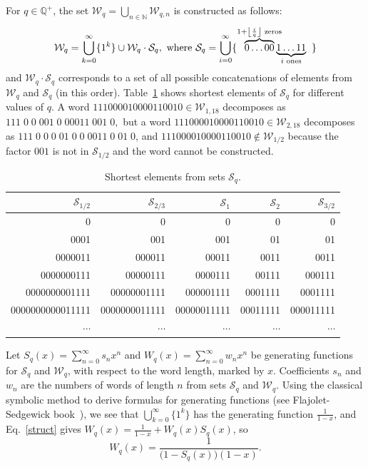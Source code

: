 \documentclass[a4paper,12pt]{article}
\theoremstyle{definition}
\newcommand{\W}{\mathcal{W}}
\newcommand{\N}{\mathbb{N}}
\newcommand{\Q}{\mathbb{Q}}
\newcommand{\s}{\mathcal{S}} %
\def\S{\mathcal{S}}
\begin{document}
For $q \in \Q^+$, the set $\W_q = \bigcup_{n \in \N} \W_{q,n}$ is constructed as follows:
\begin{equation}
\W_q = \bigcup_{k=0}^{\infty} \{1^k\} \cup \W_q \cdot \s_q, \text{
  where } \s_q = \bigcup_{i=0}^\infty \{ \overbrace{0\ldots00}^{1 +
  \left\lfloor \frac{i}{q} \right\rfloor \text{ zeros}}\mkern-13mu
\underbrace{1\ldots11}_{i \text{ ones}} \;\; \}
\label{struct}
\end{equation}
and $\W_q \cdot \s_q$ corresponds to a set of all possible
concatenations of elements from $\W_q$ and $\s_q$ (in this order).
Table~\ref{t1} shows shortest elements of $\s_q$ for different values
of $q$. A word $111000010000110010 \in \W_{1,18}$ decomposes as $111
\; 0 \; 0 \; 001 \; 0 \; 00011 \; 001 \; 0,$ but a word
$111000010000110010 \in \W_{2,18}$ decomposes as $111 \; 0 \; 0 \; 0
\; 01 \; 0 \; 0 \; 0011 \; 0 \; 01 \; 0$, and $111000010000110010
\notin \W_{1/2}$ because the factor $001$ is not in $\s_{1/2}$ and the
word cannot be constructed.

\begin{table}[ht]
\begin{center}
  \small
  \begin{tabular}{r|r|r|r|r}
$\s_{1/2}$ & $\s_{2/3}$ & $\s_1$ & $\s_2$ & $\s_{3/2}$  \\\hline
0                & 0             & 0           & 0        & 0         \\
0001             & 001           & 001         & 01       & 01        \\
0000011          & 000011        & 00011       & 0011     & 0011      \\
0000000111       & 00000111      & 0000111     & 00111    & 000111    \\
0000000001111    & 00000001111   & 000001111   & 0001111  & 0001111   \\
0000000000011111 & 0000000011111 & 00000011111 & 00011111 & 000011111 \\
$\cdots$ & $\cdots$ & $\cdots$ & $\cdots$ & $\cdots$ \\
  \end{tabular}
\end{center}
\caption{Shortest elements from sets $\s_q$.}
\label{t1}
\end{table}

Let $S_q(x) = \sum_{n = 0}^\infty s_n x^n$ and $W_q(x) = \sum_{n =
  0}^\infty w_n x^n$ be generating functions for $\S_q$ and
$\W_q$, with respect to the word length, marked by $x$. Coefficients
$s_n$ and $w_n$ are the numbers of words of length $n$ from sets
$\S_q$ and $\W_q$. Using the classical symbolic method to derive
formulas for generating functions (see Flajolet-Sedgewick
book~\cite{fla}), we see that $\bigcup_{k=0}^{\infty} \{1^k\}$ has the
generating function $\frac{1}{1-x}$, and Eq.~\eqref{struct} gives
$W_q(x) = \frac{1}{1-x} + W_q (x) S_q(x)$, so
\begin{equation}
  W_q(x) = \frac{1}{\big(1 - S_q(x)\big)(1-x)}.
  \label{wqx}
\end{equation}
\end{document}
